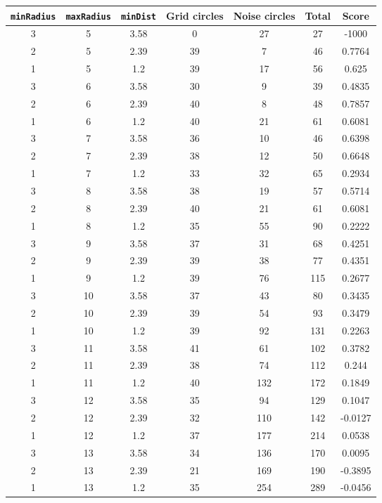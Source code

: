 \documentclass[letterpaper, 12pt]{article}
\begin{document}
\begin{longtable}{|c|c|c|c|c|c|c|}
\hline
\textbf{\texttt{minRadius}} & \textbf{\texttt{maxRadius}} & \textbf{\texttt{minDist}} & \textbf{Grid circles} & \textbf{Noise circles} & \textbf{Total} & \textbf{Score} \\
\hline
3 & 5 & 3.58 & 0 & 27 & 27 & -1000 \\
\hline
2 & 5 & 2.39 & 39 & 7 & 46 & 0.7764 \\
\hline
1 & 5 & 1.2 & 39 & 17 & 56 & 0.625 \\
\hline
3 & 6 & 3.58 & 30 & 9 & 39 & 0.4835 \\
\hline
2 & 6 & 2.39 & 40 & 8 & 48 & 0.7857 \\
\hline
1 & 6 & 1.2 & 40 & 21 & 61 & 0.6081 \\
\hline
3 & 7 & 3.58 & 36 & 10 & 46 & 0.6398 \\
\hline
2 & 7 & 2.39 & 38 & 12 & 50 & 0.6648 \\
\hline
1 & 7 & 1.2 & 33 & 32 & 65 & 0.2934 \\
\hline
3 & 8 & 3.58 & 38 & 19 & 57 & 0.5714 \\
\hline
2 & 8 & 2.39 & 40 & 21 & 61 & 0.6081 \\
\hline
1 & 8 & 1.2 & 35 & 55 & 90 & 0.2222 \\
\hline
3 & 9 & 3.58 & 37 & 31 & 68 & 0.4251 \\
\hline
2 & 9 & 2.39 & 39 & 38 & 77 & 0.4351 \\
\hline
1 & 9 & 1.2 & 39 & 76 & 115 & 0.2677 \\
\hline
3 & 10 & 3.58 & 37 & 43 & 80 & 0.3435 \\
\hline
2 & 10 & 2.39 & 39 & 54 & 93 & 0.3479 \\
\hline
1 & 10 & 1.2 & 39 & 92 & 131 & 0.2263 \\
\hline
3 & 11 & 3.58 & 41 & 61 & 102 & 0.3782 \\
\hline
2 & 11 & 2.39 & 38 & 74 & 112 & 0.244 \\
\hline
1 & 11 & 1.2 & 40 & 132 & 172 & 0.1849 \\
\hline
3 & 12 & 3.58 & 35 & 94 & 129 & 0.1047 \\
\hline
2 & 12 & 2.39 & 32 & 110 & 142 & -0.0127 \\
\hline
1 & 12 & 1.2 & 37 & 177 & 214 & 0.0538 \\
\hline
3 & 13 & 3.58 & 34 & 136 & 170 & 0.0095 \\
\hline
2 & 13 & 2.39 & 21 & 169 & 190 & -0.3895 \\
\hline
1 & 13 & 1.2 & 35 & 254 & 289 & -0.0456 \\

\end{longtable}
\end{document}
